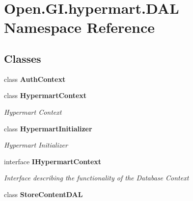 \section{Open.\+G\+I.\+hypermart.\+D\+AL Namespace Reference}
\label{namespace_open_1_1_g_i_1_1hypermart_1_1_d_a_l}
\subsection*{Classes}
\begin{DoxyCompactItemize}
\item 
class \textbf{ Auth\+Context}
\item 
class \textbf{ Hypermart\+Context}
\begin{DoxyCompactList}\small\item\em Hypermart Context \end{DoxyCompactList}\item 
class \textbf{ Hypermart\+Initializer}
\begin{DoxyCompactList}\small\item\em Hypermart Initializer \end{DoxyCompactList}\item 
interface \textbf{ I\+Hypermart\+Context}
\begin{DoxyCompactList}\small\item\em Interface describing the functionality of the Database Context \end{DoxyCompactList}\item 
class \textbf{ Store\+Content\+D\+AL}
\end{DoxyCompactItemize}
